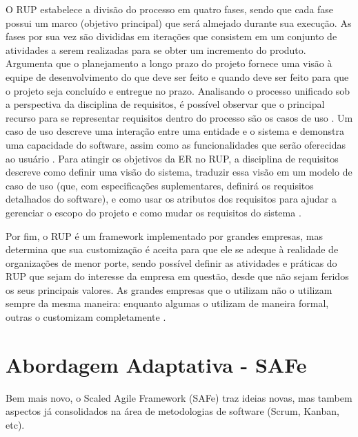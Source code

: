 O RUP estabelece a divisão do processo em quatro fases, sendo que cada fase possui um marco (objetivo principal) que será almejado durante sua execução. As fases por sua vez são divididas em iterações que consistem em um conjunto de atividades a serem realizadas para se obter um incremento do produto. Argumenta que o planejamento a longo prazo do projeto fornece uma visão à equipe de desenvolvimento do que deve ser feito e quando deve ser feito para que o projeto seja concluído e entregue no prazo. Analisando o processo unificado sob a perspectiva da disciplina de requisitos, é possível observar que o principal recurso para se representar requisitos dentro do processo são os casos de uso \cite[p. 45]{kruchten001}. Um caso de uso descreve uma interação entre uma entidade e o sistema e demonstra uma capacidade do software, assim como as funcionalidades que serão oferecidas ao usuário \cite[p. 124-125]{kruchten001}. Para atingir os objetivos da ER no RUP, a disciplina de requisitos descreve como definir uma visão do sistema, traduzir essa visão em um modelo de caso de uso (que, com especificações suplementares, definirá os requisitos detalhados do software), e como usar os atributos dos requisitos para ajudar a gerenciar o escopo do projeto e como mudar os requisitos do sistema \cite[p. 182-183]{kruchten001}.


Por fim, o RUP é um framework implementado por grandes empresas, mas determina que sua customização é aceita para que ele se adeque à realidade de organizações de menor porte, sendo possível definir as atividades e práticas do RUP que sejam do interesse da empresa em questão, desde que não sejam feridos os seus principais valores. As grandes empresas que o utilizam não o utilizam sempre da mesma maneira: enquanto algumas o utilizam de maneira formal, outras o customizam completamente \cite[p. 57]{kruchten001}.

\section{Abordagem Adaptativa - SAFe}
Bem mais novo, o Scaled Agile Framework (SAFe) traz ideias novas, mas tambem aspectos já consolidados na área de metodologias de software (Scrum, Kanban, etc).

